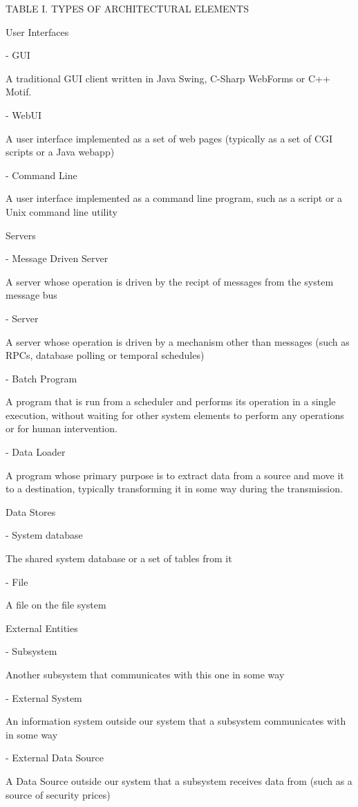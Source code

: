 \begin{itemise}
  

TABLE I.  TYPES OF ARCHITECTURAL ELEMENTS

User Interfaces

- GUI

A traditional GUI client written in Java Swing, C-Sharp WebForms or C++ Motif.

- WebUI

A user interface implemented as a set of web pages (typically as a set of CGI scripts or a Java webapp)

- Command Line

A user interface implemented as a command line program, such as a script or a Unix command line utility

Servers

- Message Driven Server

A server whose operation is driven by the recipt of messages from the system message bus

- Server 

A server whose operation is driven by a mechanism other than messages (such as RPCs, database polling or temporal schedules)

- Batch Program

A program that is run from a scheduler and performs its operation in a single execution, without waiting for other system elements to perform any operations or for human intervention.

- Data Loader

A program whose primary purpose is to extract data from a source and move it to a destination, typically transforming it in some way during the transmission.

Data Stores

- System database

The shared system database or a set of tables from it

- File

A file on the file system

External Entities

- Subsystem

Another subsystem that communicates with this one in some way

- External System

An information system outside our system that a subsystem communicates with in some way

- External Data Source

A Data Source outside our system that a subsystem receives data from (such as a source of security prices)


\end{itemise}
